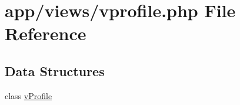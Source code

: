 \hypertarget{vprofile_8php}{}\section{app/views/vprofile.php File Reference}
\label{vprofile_8php}
\subsection*{Data Structures}
\begin{DoxyCompactItemize}
\item 
class \hyperlink{classvProfile}{v\+Profile}
\end{DoxyCompactItemize}
